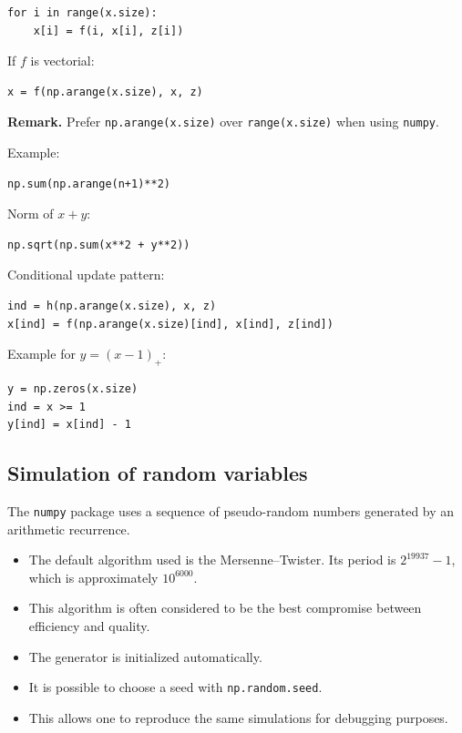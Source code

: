 \documentclass[11pt]{article}
\begin{document}
\begin{lstlisting}
for i in range(x.size):
    x[i] = f(i, x[i], z[i])
\end{lstlisting}

If $f$ is vectorial:
\begin{lstlisting}
x = f(np.arange(x.size), x, z)
\end{lstlisting}

\medskip
\textbf{Remark.} Prefer \texttt{np.arange(x.size)} over \texttt{range(x.size)} when using \texttt{numpy}.

Example:
\begin{lstlisting}
np.sum(np.arange(n+1)**2)
\end{lstlisting}

Norm of $x+y$:
\begin{lstlisting}
np.sqrt(np.sum(x**2 + y**2))
\end{lstlisting}

Conditional update pattern:
\begin{lstlisting}
ind = h(np.arange(x.size), x, z)
x[ind] = f(np.arange(x.size)[ind], x[ind], z[ind])
\end{lstlisting}

Example for $y=(x-1)_+$:
\begin{lstlisting}
y = np.zeros(x.size)
ind = x >= 1
y[ind] = x[ind] - 1
\end{lstlisting}

\subsection{Simulation of random variables}

The \texttt{numpy} package uses a sequence of pseudo-random numbers generated by an arithmetic recurrence.

\begin{itemize}
\item The default algorithm used is the Mersenne--Twister. Its period is $2^{19937}-1$, which is approximately $10^{6000}$.
\item This algorithm is often considered to be the best compromise between efficiency and quality.
\item The generator is initialized automatically.
\item It is possible to choose a seed with \texttt{np.random.seed}.
\item This allows one to reproduce the same simulations for debugging purposes.
\end{itemize}
\end{document}
